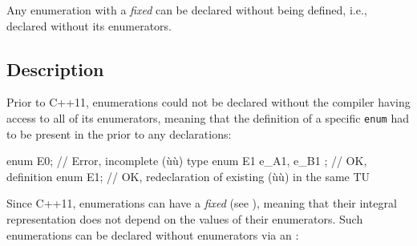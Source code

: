 

\label{opaque-enumeration-declarations}
\setcounter{table}{0}
\setcounter{footnote}{0}
\setcounter{lstlisting}{0}

Any enumeration with a \emph{fixed}  can be declared without being defined, i.e., declared without its enumerators.


\subsection[Description]{Description}\label{description}

Prior to C++11, enumerations could not be declared without the compiler having access to all of its enumerators, meaning that the definition of a specific \lstinline!enum! had to be present in the  prior to any declarations:

\begin{emcppslisting}
enum E0;                 // Error, incomplete (ù{}ù) type
enum E1 { e_A1, e_B1 };  // OK, definition
enum E1;                 // OK, redeclaration of existing (ù{}ù) in the same TU
\end{emcppslisting}

Since C++11, enumerations can have a \emph{fixed}  (see ), meaning that their integral representation does not depend on the values of their enumerators.  Such enumerations can be declared without enumerators via an :

